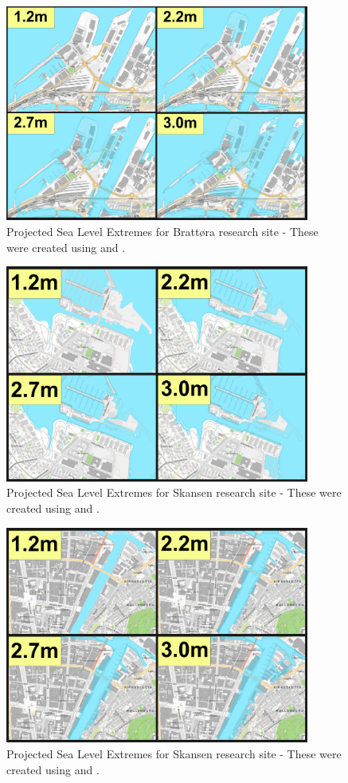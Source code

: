 \begin{figure}[h!]
    \centering
    \includegraphics[width=10cm]{fig_sle/brattora-sle-num.png}
    \caption{Projected Sea Level Extremes for Brattøra research site - These were created using \cite{kartverket_se_2021} and \cite{stormflo_database_stormflo_2021}. }
    \label{fig:sle-brattora-num}
\end{figure}

\begin{figure}[h!]
    \centering
    \includegraphics[width=10cm]{fig_sle/grillstad-sle-num.png}
    \caption{Projected Sea Level Extremes for Skansen research site - These were created using \cite{kartverket_se_2021} and \cite{stormflo_database_stormflo_2021}. }
    \label{fig:sle-grillstad-num}
\end{figure}

\begin{figure}[h!]
    \centering
    \includegraphics[width=10cm]{fig_sle/nidelva-sle-num.png}
    \caption{Projected Sea Level Extremes for Skansen research site - These were created using \cite{kartverket_se_2021} and \cite{stormflo_database_stormflo_2021}. }
    \label{fig:sle-nidelva-num}
\end{figure}

